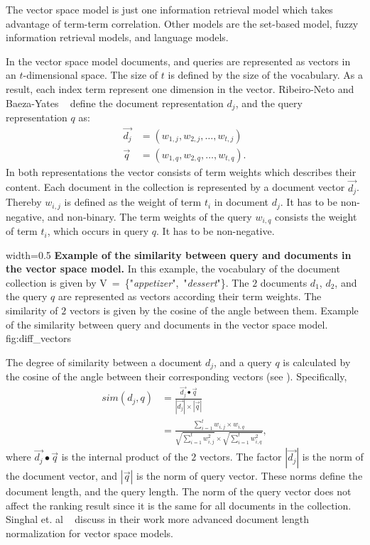 The vector space model is just one information retrieval model which takes advantage of term-term correlation. Other models are the set-based model, fuzzy information retrieval models, and language models.

In the vector space model documents, and queries are represented as vectors in an $t$-dimensional space. The size of $t$ is defined by the size of the vocabulary. As a result, each index term represent one dimension in the vector. Ribeiro-Neto and Baeza-Yates ~\cite{ModernInvormationRetrieval1999} define the document representation $d_j$, and the query representation $q$ as:
\begin{align}
  \vec{d_j} & = (w_{1, j}, w_{2, j}, \dots, w_{t, j}) \\
  \vec{q} & = (w_{1, q}, w_{2, q}, \dots, w_{t, q}).
\end{align}
In both representations the vector consists of term weights which describes their content. Each document in the collection is represented by a document vector $\vec{d_j}$. Thereby $w_{i,j}$ is defined as the weight of term $t_i$ in document $d_j$. It has to be non-negative, and non-binary. The term weights of the query $w_{i, q}$ consists the weight of term $t_i$, which occurs in query $q$. It has to be non-negative.

      {width=0.5\textwidth}
      {\textbf{Example of the similarity between query and documents in the vector space model.} In this example, the vocabulary of the document collection is given by \mbox{V = \{"\textit{appetizer}", "\textit{dessert}"\}}. The $2$ documents $d_1$, $d_2$, and the query $q$ are represented as vectors according their term weights. The similarity of $2$ vectors is given by the cosine of the angle between them.}
      {Example of the similarity between query and documents in the vector space model.}
      {fig:diff_vectors}

The degree of similarity between a document $d_j$, and a query $q$ is calculated by the cosine of the angle between their corresponding vectors (see ). Specifically,
\begin{equation}
  \label{vector_space_similarity}
  \begin{split}
    sim(d_j, q) & = \frac{\vec{d_j} \bullet \vec{q}}{|\vec{d_j}| \times |\vec{q}|} \\
    & = \frac{\sum_{i = 1}^t w_{i, j} \times w_{i, q}}{\sqrt{\sum_{i = 1}^t w_{i, j}^2} \times \sqrt{\sum_{i = 1}^t w_{i, q}^2}},
  \end{split}
\end{equation}
where $\vec{d_j} \bullet \vec{q}$ is the internal product of the $2$ vectors. The factor $|\vec{d_j}|$ is the norm of the document vector, and $|\vec{q}|$ is the norm of query vector. These norms define the document length, and the query length. The norm of the query vector does not affect the ranking result since it is the same for all documents in the collection. Singhal et. al ~\cite{SinghalBM96} discuss in their work more advanced document length normalization for vector space models.

